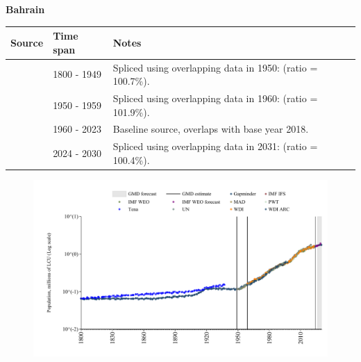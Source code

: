 \documentclass[12pt,a4paper,landscape]{article}
\begin{document}
\begin{adjustbox}{max totalsize={\paperwidth}{\paperheight},center}
\begin{minipage}[t][\textheight][t]{\textwidth}
\vspace*{0.5cm}
{}
\begin{center}
{\Large\bfseries Bahrain}
\end{center}
\vspace{0.5cm}
\begin{table}[H]
\centering
\small
\begin{tabular}{|l|l|l|}
\hline
\textbf{Source} & \textbf{Time span} & \textbf{Notes} \\
\hline
\rowcolor{white}\cite{Gapminder}& 1800 - 1949 &Spliced using overlapping data in 1950: (ratio = 100.7\%).\\
\rowcolor{lightgray}\cite{IMF_IFS}& 1950 - 1959 &Spliced using overlapping data in 1960: (ratio = 101.9\%).\\
\rowcolor{white}\cite{WDI}& 1960 - 2023 &Baseline source, overlaps with base year 2018.\\
\rowcolor{lightgray}\cite{Gapminder}& 2024 - 2030 &Spliced using overlapping data in 2031: (ratio = 100.4\%).\\
\hline
\end{tabular}
\end{table}
\begin{figure}[H]
\centering
\includegraphics[width=\textwidth,height=0.6\textheight,keepaspectratio]{graphs/BHR_pop.pdf}
\end{figure}
\end{minipage}
\end{adjustbox}
\end{document}
